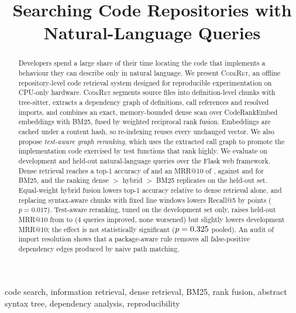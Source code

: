 \documentclass[conference]{IEEEtran}
\newcommand{\sys}{\textsc{CodeRet}}
\begin{document}
\title{Searching Code Repositories with\\ Natural-Language Queries}

\author{}

\maketitle

\begin{abstract}
Developers spend a large share of their time locating the code that implements
a behaviour they can describe only in natural language. We present \sys{}, an
offline repository-level code retrieval system designed for reproducible
experimentation on CPU-only hardware. \sys{} segments source files into
definition-level chunks with tree-sitter, extracts a dependency graph of
definitions, call references and resolved imports, and combines an exact,
memory-bounded dense scan over CodeRankEmbed embeddings with BM25, fused by
weighted reciprocal rank fusion. Embeddings are cached under a content hash, so
re-indexing reuses every unchanged vector. We also propose \emph{test-aware graph
reranking}, which uses the extracted call graph to promote the implementation
code exercised by test functions that rank highly. We evaluate on \NQueries{}
development and \HoQueries{} held-out natural-language queries over the Flask web
framework. Dense retrieval reaches a top-1 accuracy of \DenseAccOne{} and an
MRR@10 of \DenseMRR{}, against \LexAccOne{} and \LexMRR{} for BM25, and the
ranking dense $>$ hybrid $>$ BM25 replicates on the held-out set. Equal-weight
hybrid fusion lowers top-1 accuracy relative to dense retrieval alone, and
replacing syntax-aware chunks with fixed line windows lowers Recall@5 by
\WinDRFive{} points ($p = 0.017$). Test-aware reranking, tuned on the
development set only, raises held-out MRR@10 from \HoDenseMRR{} to
\HoGDenseMRR{} (4 queries improved, none worsened) but slightly lowers
development MRR@10; the effect is not statistically significant ($p = 0.325{}$
pooled). An audit of import resolution shows that a package-aware rule removes
all \FalseEdges{} false-positive dependency edges produced by naive path matching.
\end{abstract}

\begin{IEEEkeywords}
code search, information retrieval, dense retrieval, BM25, rank fusion,
abstract syntax tree, dependency analysis, reproducibility
\end{IEEEkeywords}
\end{document}
